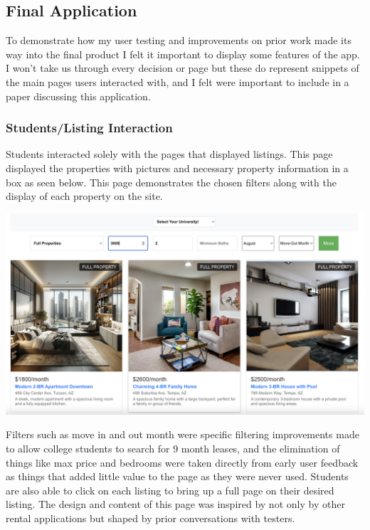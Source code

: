 \documentclass[10pt,twocolumn]{article}
\begin{document}
\subsection{Final Application}
To demonstrate how my user testing and improvements on prior work made its way into the final product I felt it important to display some features of the app. I won't take us through every decision or page but these do represent snippets of the main pages users interacted with, and I felt were important to include in a paper discussing this application. 

\subsubsection{Students/Listing Interaction}
Students interacted solely with the pages that displayed listings. This page displayed the properties with pictures and necessary property information in a box as seen below. This page demonstrates the chosen filters along with the display of each property on the site. \\

\centerline{\includegraphics[scale=.15]{ListingPage.png}} 

Filters such as move in and out month were specific filtering improvements made to allow college students to search for 9 month leases, and the elimination of things like max price and bedrooms were taken directly from early user feedback as things that added little value to the page as they were never used. Students are also able to click on each listing to bring up a full page on their desired listing. The design and content of this page was inspired by not only by other rental applications but shaped by prior conversations with testers.  \\
\end{document}
